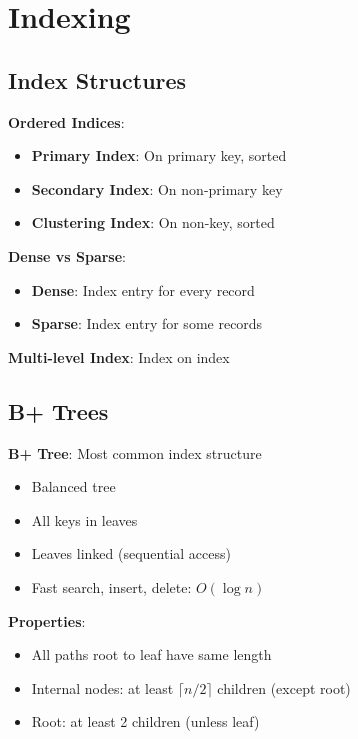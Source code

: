 \documentclass[12pt,a4paper]{report}
\begin{document}
\section{Indexing}

\subsection{Index Structures}
\begin{concept}
\textbf{Ordered Indices}:
\begin{itemize}
    \item \textbf{Primary Index}: On primary key, sorted
    \item \textbf{Secondary Index}: On non-primary key
    \item \textbf{Clustering Index}: On non-key, sorted
\end{itemize}

\textbf{Dense vs Sparse}:
\begin{itemize}
    \item \textbf{Dense}: Index entry for every record
    \item \textbf{Sparse}: Index entry for some records
\end{itemize}

\textbf{Multi-level Index}: Index on index
\end{concept}

\subsection{B+ Trees}
\begin{concept}
\textbf{B+ Tree}: Most common index structure
\begin{itemize}
    \item Balanced tree
    \item All keys in leaves
    \item Leaves linked (sequential access)
    \item Fast search, insert, delete: $O(\log n)$
\end{itemize}

\textbf{Properties}:
\begin{itemize}
    \item All paths root to leaf have same length
    \item Internal nodes: at least $\lceil n/2 \rceil$ children (except root)
    \item Root: at least 2 children (unless leaf)
\end{itemize}
\end{concept}
\end{document}
